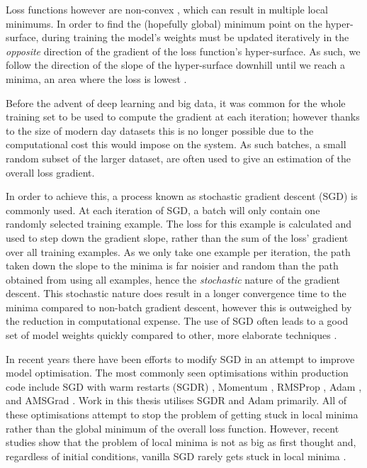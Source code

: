Loss functions however are non-convex \cite{choromanska_loss_2015}, which can result in multiple local minimums. In order to find the (hopefully global) minimum point on the hyper-surface, during training the model's weights must be updated iteratively in the \textit{opposite} direction of the gradient of the loss function's hyper-surface. As such, we follow the direction of the slope of the hyper-surface downhill until we reach a minima, an area where the loss is lowest \cite{ruder_overview_2016}. 

Before the advent of deep learning and big data, it was common for the whole training set to be used to compute the gradient at each iteration; however thanks to the size of modern day datasets this is no longer possible due to the computational cost this would impose on the system. As such batches, a small random subset of the larger dataset, are often used to give an estimation of the overall loss gradient.

In order to achieve this, a process known as stochastic gradient descent (SGD) is commonly used. At each iteration of SGD, a batch will only contain one randomly selected training example. The loss for this example is calculated and used to step down the gradient slope, rather than the sum of the loss' gradient over all training examples. As we only take one example per iteration, the path taken down the slope to the minima is far noisier and random than the path obtained from using all examples, hence the \textit{stochastic} nature of the gradient descent. This stochastic nature does result in a longer convergence time to the minima compared to non-batch gradient descent, however this is outweighed by the reduction in computational expense. The use of SGD often leads to a good set of model weights quickly compared to other, more elaborate techniques \cite{bottou_tradeoffs_2008}. 

In recent years there have been efforts to modify SGD in an attempt to improve model optimisation. The most commonly seen optimisations within production code include SGD with warm restarts (SGDR) \cite{loshchilov_sgdr:_2016}, Momentum \cite{qian_momentum_1999}, RMSProp \cite{tieleman_lecture_2012}, Adam \cite{kingma_adam:_2014}, and AMSGrad \cite{reddi_convergence_2019}. Work in this thesis utilises SGDR and Adam primarily. All of these optimisations attempt to stop the problem of getting stuck in local minima rather than the global minimum of the overall loss function. However, recent studies show that the problem of local minima is not as big as first thought and, regardless of initial conditions, vanilla SGD rarely gets stuck in local minima \cite{dauphin_identifying_2014, choromanska_loss_2015}.

